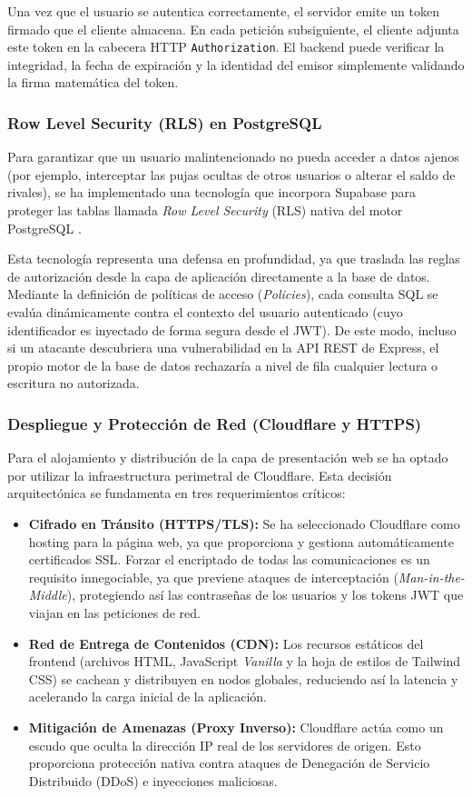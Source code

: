Una vez que el usuario se autentica correctamente, el servidor emite un token firmado que el cliente almacena. En cada petición subsiguiente, el cliente adjunta este token en la cabecera HTTP \texttt{Authorization}. El backend puede verificar la integridad, la fecha de expiración y la identidad del emisor simplemente validando la firma matemática del token.

\subsubsection{Row Level Security (RLS) en PostgreSQL}
Para garantizar que un usuario malintencionado no pueda acceder a datos ajenos (por ejemplo, interceptar las pujas ocultas de otros usuarios o alterar el saldo de rivales), se ha implementado una tecnología que incorpora Supabase para proteger las tablas llamada \textit{Row Level Security} (RLS) nativa del motor PostgreSQL \cite{postgresql_rls}.

Esta tecnología representa una defensa en profundidad, ya que traslada las reglas de autorización desde la capa de aplicación directamente a la base de datos. Mediante la definición de políticas de acceso (\textit{Policies}), cada consulta SQL se evalúa dinámicamente contra el contexto del usuario autenticado (cuyo identificador es inyectado de forma segura desde el JWT). De este modo, incluso si un atacante descubriera una vulnerabilidad en la API REST de Express, el propio motor de la base de datos rechazaría a nivel de fila cualquier lectura o escritura no autorizada.

\subsubsection{Despliegue y Protección de Red (Cloudflare y HTTPS)}
Para el alojamiento y distribución de la capa de presentación web se ha optado por utilizar la infraestructura perimetral de Cloudflare. Esta decisión arquitectónica se fundamenta en tres requerimientos críticos:

\begin{itemize}
    \item \textbf{Cifrado en Tránsito (HTTPS/TLS):} Se ha seleccionado Cloudflare como hosting para la página web, ya que proporciona y gestiona automáticamente certificados SSL. Forzar el encriptado de todas las comunicaciones es un requisito innegociable, ya que previene ataques de interceptación (\textit{Man-in-the-Middle}), protegiendo así las contraseñas de los usuarios y los tokens JWT que viajan en las peticiones de red.
    \item \textbf{Red de Entrega de Contenidos (CDN):} Los recursos estáticos del frontend (archivos HTML, JavaScript \textit{Vanilla} y la hoja de estilos de Tailwind CSS) se cachean y distribuyen en nodos globales, reduciendo así la latencia y acelerando la carga inicial de la aplicación.
    \item \textbf{Mitigación de Amenazas (Proxy Inverso):} Cloudflare actúa como un escudo que oculta la dirección IP real de los servidores de origen. Esto proporciona protección nativa contra ataques de Denegación de Servicio Distribuido (DDoS) e inyecciones maliciosas.
\end{itemize}

